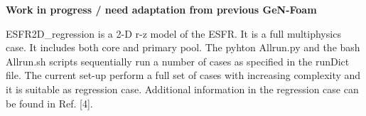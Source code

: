 {\bfseries Work in progress / need adaptation from previous Ge\+N-\/\+Foam}
\begin{DoxyItemize}
\item E\+S\+F\+R2\+D\+\_\+regression is a 2-\/D r-\/z model of the E\+S\+FR. It is a full multiphysics case. It includes both core and primary pool. The pyhton Allrun.\+py and the bash Allrun.\+sh scripts sequentially run a number of cases as specified in the run\+Dict file. The current set-\/up perform a full set of cases with increasing complexity and it is suitable as regression case. Additional information in the regression case can be found in Ref. \mbox{[}4\mbox{]}. 
\end{DoxyItemize}